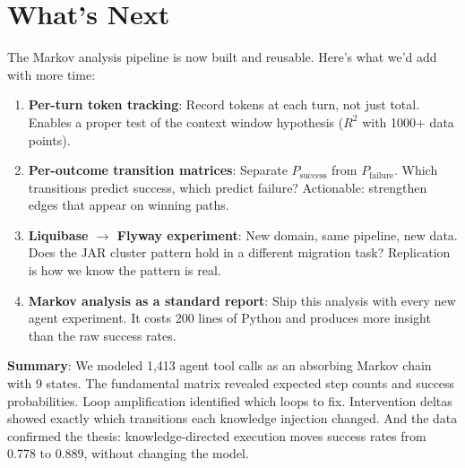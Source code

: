 \documentclass[11pt,a4paper]{article}
\begin{document}
\section{What's Next}

The Markov analysis pipeline is now built and reusable.
Here's what we'd add with more time:

\begin{enumerate}
  \item \textbf{Per-turn token tracking}: Record tokens at each turn, not just total.
        Enables a proper test of the context window hypothesis ($R^2$ with 1000+ data points).

  \item \textbf{Per-outcome transition matrices}: Separate $P_{\text{success}}$ from
        $P_{\text{failure}}$. Which transitions predict success, which predict failure?
        Actionable: strengthen edges that appear on winning paths.

  \item \textbf{Liquibase $\to$ Flyway experiment}: New domain, same pipeline, new data.
        Does the JAR cluster pattern hold in a different migration task?
        Replication is how we know the pattern is real.

  \item \textbf{Markov analysis as a standard report}:
        Ship this analysis with every new agent experiment.
        It costs 200 lines of Python and produces more insight than the raw success rates.
\end{enumerate}

\bigskip
\noindent\textbf{Summary}: We modeled 1,413 agent tool calls as an absorbing Markov chain
with 9 states. The fundamental matrix revealed expected step counts and success probabilities.
Loop amplification identified which loops to fix. Intervention deltas showed exactly
which transitions each knowledge injection changed. And the data confirmed the thesis:
knowledge-directed execution moves success rates from 0.778 to 0.889, without changing the model.
\end{document}
